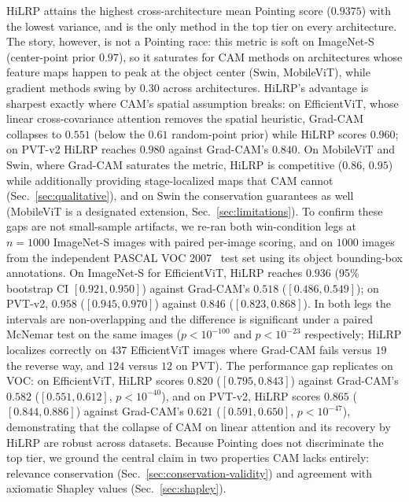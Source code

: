 \documentclass[lettersize,journal]{IEEEtran}
\begin{document}
HiLRP attains the highest cross-architecture mean Pointing score ($0.9375$) with the lowest variance, and is the only method in the top tier on every architecture. The story, however, is not a Pointing race: this metric is soft on ImageNet-S (center-point prior $0.97$), so it saturates for CAM methods on architectures whose feature maps happen to peak at the object center (Swin, MobileViT), while gradient methods swing by $0.30$ across architectures. HiLRP's advantage is sharpest exactly where CAM's spatial assumption breaks: on EfficientViT, whose linear cross-covariance attention removes the spatial heuristic, Grad-CAM collapses to $0.551$ (below the $0.61$ random-point prior) while HiLRP scores $0.960$; on PVT-v2 HiLRP reaches $0.980$ against Grad-CAM's $0.840$. On MobileViT and Swin, where Grad-CAM saturates the metric, HiLRP is competitive ($0.86$, $0.95$) while additionally providing stage-localized maps that CAM cannot (Sec.~\ref{sec:qualitative}), and on Swin the conservation guarantees as well (MobileViT is a designated extension, Sec.~\ref{sec:limitations}). To confirm these gaps are not small-sample artifacts, we re-ran both win-condition legs at $n{=}1000$ ImageNet-S images with paired per-image scoring, and on $1000$ images from the independent PASCAL VOC 2007~\cite{everingham2010voc} test set using its object bounding-box annotations. On ImageNet-S for EfficientViT, HiLRP reaches $0.936$ (95\% bootstrap CI $[0.921,0.950]$) against Grad-CAM's $0.518$ ($[0.486,0.549]$); on PVT-v2, $0.958$ ($[0.945,0.970]$) against $0.846$ ($[0.823,0.868]$). In both legs the intervals are non-overlapping and the difference is significant under a paired McNemar test on the same images ($p<10^{-100}$ and $p<10^{-23}$ respectively; HiLRP localizes correctly on $437$ EfficientViT images where Grad-CAM fails versus $19$ the reverse way, and $124$ versus $12$ on PVT). The performance gap replicates on VOC: on EfficientViT, HiLRP scores $0.820$ ($[0.795,0.843]$) against Grad-CAM's $0.582$ ($[0.551,0.612]$, $p<10^{-40}$), and on PVT-v2, HiLRP scores $0.865$ ($[0.844,0.886]$) against Grad-CAM's $0.621$ ($[0.591,0.650]$, $p<10^{-47}$), demonstrating that the collapse of CAM on linear attention and its recovery by HiLRP are robust across datasets. Because Pointing does not discriminate the top tier, we ground the central claim in two properties CAM lacks entirely: relevance conservation (Sec.~\ref{sec:conservation-validity}) and agreement with axiomatic Shapley values (Sec.~\ref{sec:shapley}).
\end{document}
